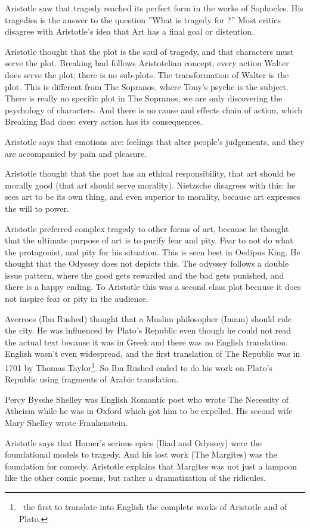 \documentclass[12pt, a4paper]{article}
\begin{document}
Aristotle saw that tragedy reached its perfect form in the works of Sophocles. His tragedies is the answer
to the question ''What is tragedy for ?'' Most critics disagree with Aristotle's idea that Art has
a final goal or distention.

Aristotle thought that the plot is the soul of tragedy, and that characters must serve the plot.
Breaking bad follows Aristotelian concept, every action Walter does serve the plot; there is
no sub-plots. The transformation of Walter is the plot. 
This is different from The Sopranos, where Tony's psyche is the subject.
There is really no specific plot in The Sopranos, we are only discovering the psychology 
of characters. And there is no cause and effects chain of action, which Breaking Bad does:
every action has its consequences.

Aristotle says that emotions are: feelings that alter people’s judgements, and they are
accompanied by pain and pleasure.

Aristotle thought that the poet has an ethical responsibility, that art should be morally good (that
art should serve morality).
Nietzsche disagrees with this: he sees art to be its own thing, and even superior to morality,
because art expresses the will to power. 

Aristotle preferred complex tragedy to other forms of art, because he thought that the ultimate 
purpose of art is to purify fear and pity. Fear to not do what the protagonist, and pity for his
situation. This is seen best in Oedipus King. He thought that the Odyssey does not depicts this.
The odyssey follows a double issue pattern, where the good gets rewarded and the bad gets punished,
and there is a happy ending. To Aristotle this was a second class plot because it does not inspire
fear or pity in the audience.

Averroes (Ibn Rushed) thought that a Muslim philosopher (Imam) should rule the city. He
was influenced by Plato's Republic even though he could not read the actual text because
it was in Greek and there was no English translation. English wasn't even widespread, and the
first translation of The Republic was in 1701 by Thomas Taylor\footnote{\, the first to translate into English 
the complete works of Aristotle and of Plato.}. So Ibn Rushed ended to do his work on Plato's 
Republic using fragments of Arabic translation.

Percy Bysshe Shelley was English Romantic poet who wrote The Necessity of Atheism while he was 
in Oxford which got him to be expelled. His second wife Mary Shelley wrote Frankenstein. 

Aristotle says that Homer's serious epics (Iliad and Odyssey) were the foundational models to tragedy.
And his lost work (The Margites) was the foundation for comedy. Aristotle explains that Margites was 
not just a lampoon like the other comic poems, but rather a dramatization of the ridicules.
\end{document}
